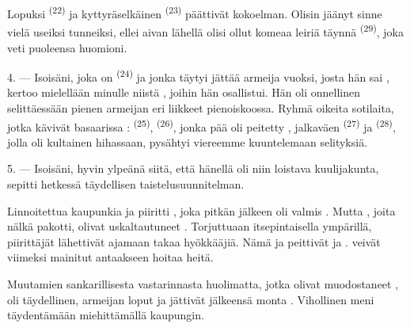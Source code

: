 Lopuksi  \textsuperscript{(22)} ja kyttyräselkäinen
 \textsuperscript{(23)} päättivät kokoelman. Olisin jäänyt
sinne vielä useiksi tunneiksi, ellei aivan lähellä olisi ollut komeaa leiriä
täynnä  \textsuperscript{(29)}, joka veti puoleensa
huomioni.

\VUsaut{4.0mm}
\VUsaut{2.8mm}

4. --- Isoisäni, joka on  \textsuperscript{(24)} ja jonka täytyi
jättää armeija  vuoksi, josta hän sai ,
kertoo mielellään minulle niistä , joihin hän osallistui.
Hän oli onnellinen selittäessään pienen armeijan eri liikkeet pienoiskoossa.
Ryhmä oikeita sotilaita, jotka kävivät basaarissa : 
\textsuperscript{(25)},  \textsuperscript{(26)}, jonka pää
oli peitetty , jalkaväen 
\textsuperscript{(27)} ja  \textsuperscript{(28)},
jolla oli kultainen  hihassaan, pysähtyi viereemme kuuntelemaan
selityksiä.

5. --- Isoisäni, hyvin ylpeänä siitä, että hänellä oli niin loistava
kuulijakunta, sepitti hetkessä täydellisen taistelusuunnitelman.

Linnoitettua kaupunkia  ja  piiritti
, joka pitkän  jälkeen oli valmis
. Mutta , joita nälkä pakotti, olivat
uskaltautuneet  
. Torjuttuaan  itsepintaisella
  ympärillä, 
piirittäjät lähettivät  ajamaan takaa
 hyökkääjiä. Nämä  ja peittivät
  ja .
 veivät viimeksi mainitut 
antaakseen  hoitaa heitä.

Muutamien  sankarillisesta vastarinnasta huolimatta, jotka
olivat muodostaneet ,  oli täydellinen, armeijan
loput  ja jättivät jälkeensä monta .
Vihollinen meni täydentämään  miehittämällä kaupungin.

